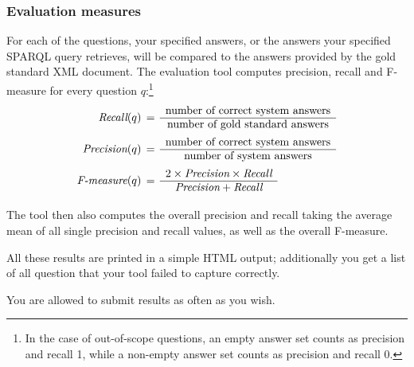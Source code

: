 \subsubsection*{Evaluation measures}

For each of the questions, your specified answers, or the answers your specified SPARQL query retrieves,
will be compared to the answers provided by the gold standard XML document. 
The evaluation tool computes precision, recall and F-measure for every question $q$:\footnote{In the case of out-of-scope 
questions, an empty answer set counts as precision and recall 1, while a non-empty answer set counts as 
precision and recall 0.}
\begin{align*}
\text{\em Recall}(q) &\, =\, \begin{array}{c} 
                  \text{number of correct system answers} \\
                  \hline 
                  \text{number of gold standard answers} \\ 
                  \end{array} \\
\text{\em Precision}(q) &\, =\, \begin{array}{c} 
                  \text{number of correct system answers} \\
                  \hline 
                  \text{number of system answers} \\ 
                  \end{array} \\
\text{\em F-measure}(q) &\, =\, \begin{array}{c}
                      2\times \text{\em Precision}\times \text{\em Recall} \\
                      \hline 
                      \text{\em Precision} + \text{\em Recall} \\
                      \end{array} \\
\end{align*}

\vspace*{-.7cm}

The tool then also computes the overall precision and recall taking the average mean of
all single precision and recall values, as well as the overall F-measure.

All these results are printed in a simple HTML output; additionally you get a list of 
all question that your tool failed to capture correctly.

You are allowed to submit results as often as you wish.
